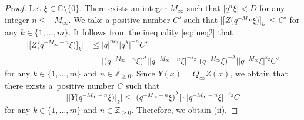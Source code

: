 \documentclass[10pt,a4paper]{amsart}
\begin{document}
\begin{proof}
Let $\xi \in \mathbb{C} \setminus \{0\} $.
There exists an integer $M_{\infty }$ such that $| q^n \xi | < D $ for any integer $n \leq -M_{\infty }$.
We take a positive number $C' $ such that $\big| \big[Z\bigl( q^{-M_{\infty }} \xi \bigr)\big]_k\big| \leq C' $ for any $k \in \{1, \dots ,m \}$.
It follows from the inequality \eqref{eq:ineq2} that
\begin{align*}
\big| \big[Z\bigl( q^{-M_{\infty } -n} \xi \bigr)\big]_k\big| &\leq |q | ^{n \varepsilon _2} \big|q ^{\lambda }\big|^{-n} C'\\
& = \big|\bigl(q^{-M_{\infty } -n } \xi \bigr)^{\lambda } \big| \big|q^{-M_{\infty } -n} \xi \big|^{ - \varepsilon _2 }
  \big|\bigl(q^{-M_{\infty } } \xi \bigr)^{- \lambda } \big| \big|q^{-M_{\infty } } \xi \big|^{ \varepsilon _2 } C' \end{align*}
 for any $k \in \{1, \dots ,m \}$ and $n \in \mathbb{Z} _{\geq 0}$.
Since $Y (x) = Q_{\infty } Z(x)$, we obtain that there exists a~positive number $C$ such that
\[
\big| \big[Y\bigl( q^{-M_{\infty } -n} \xi \bigr)\big]_k\big| \leq \big|\bigl(q^{-M_{\infty } -n } \xi \bigr)^{\lambda } \big|
\cdot \big|q^{-M_{\infty } -n} \xi \big|^{ - \varepsilon _2 } C
\]
 for any $k \in \{1, \dots ,m \}$ and $n \in \mathbb{Z} _{\geq 0}$.
Therefore, we obtain (ii).
\end{proof}
\end{document}
